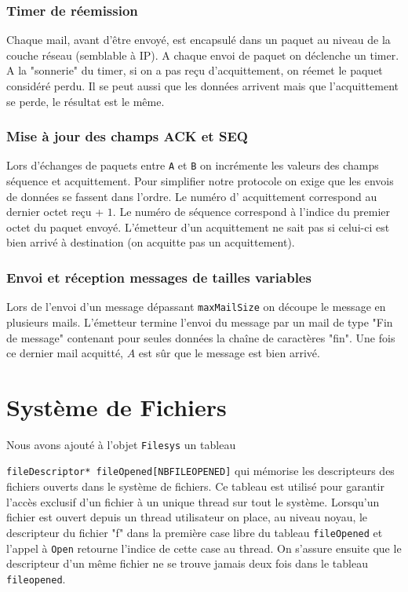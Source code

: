 \documentclass[11pt]{article}
\theoremstyle{definition}
\theoremstyle{definition}
\begin{document}
\subsubsection{Timer de réemission}
Chaque mail, avant d'être envoyé, est encapsulé dans un paquet au niveau de la couche réseau (semblable à IP). A chaque envoi de paquet on déclenche un timer. A la "sonnerie" du timer, si on a pas reçu d'acquittement, on réemet le paquet considéré perdu. Il se peut aussi que les données arrivent mais que l'acquittement se perde, le résultat est le même. 

\subsubsection{Mise à jour des champs ACK et SEQ}
Lors d'échanges de paquets entre \texttt{A} et \texttt{B} on incrémente les valeurs des champs séquence et acquittement. Pour simplifier notre protocole on exige que les envois de données se fassent dans l'ordre. Le numéro d' acquittement correspond au dernier octet reçu + $1$. Le numéro de séquence correspond à l'indice du premier octet du paquet envoyé. L'émetteur d'un acquittement ne sait pas si celui-ci est bien arrivé à destination (on acquitte pas un acquittement). 

\subsubsection{ Envoi et réception messages de tailles variables}
Lors de l'envoi d'un message dépassant \texttt{maxMailSize} on découpe le message en plusieurs mails.
L'émetteur termine l'envoi du message par un mail de type "Fin de message" contenant pour seules données
la chaîne de caractères "fin". Une fois ce dernier mail acquitté, $A$ est sûr que le message est bien arrivé.

\section{Système de Fichiers}

Nous avons ajouté à l'objet \texttt{Filesys} un tableau

\texttt{fileDescriptor* fileOpened[NBFILEOPENED]} qui mémorise les descripteurs
des fichiers ouverts dans le système de fichiers. Ce tableau est utilisé pour garantir l'accès exclusif d'un fichier à un unique thread sur tout le système. Lorsqu'un fichier est ouvert depuis un thread utilisateur on place, au niveau noyau, le descripteur du fichier "f" dans la première case libre du tableau \texttt{fileOpened} et l'appel à \texttt{Open} retourne l'indice de cette case au thread. On s'assure ensuite que le descripteur d'un même fichier ne se trouve jamais deux fois dans le tableau
\texttt{fileopened}.
\end{document}
